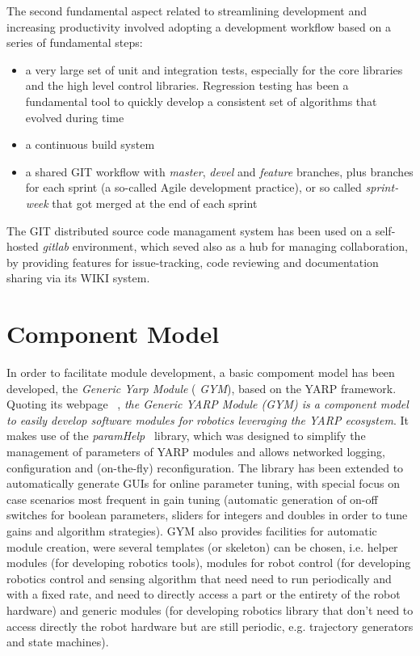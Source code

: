 The second fundamental aspect related to streamlining development and increasing productivity involved  adopting a development workflow based on a series of fundamental steps:
\begin{itemize}
 \item a very large set of unit and integration tests, especially for the core libraries and the high level control libraries. Regression testing has been a fundamental tool to quickly develop a consistent set of algorithms that evolved during time
 \item a continuous build system
 \item a shared GIT workflow with \emph{master}, \emph{devel} and \emph{feature} branches, plus branches for each sprint (a so-called Agile development practice), or so called \emph{sprint-week} that got merged at the end of each sprint
\end{itemize}
The GIT distributed source code managament system has been used on a self-hosted \emph{gitlab} environment, which seved also as a hub for managing collaboration, by providing features for issue-tracking, code reviewing and documentation sharing via its WIKI system.

\section{Component Model}
In order to facilitate module development, a basic compoment model has been developed, the \emph{Generic Yarp Module} ( \emph{GYM}), based on the YARP framework.
Quoting its webpage ~\cite{GYM}, \emph{the Generic YARP Module (GYM) is a component model to easily develop software modules for robotics leveraging the YARP ecosystem}.
It makes use of the \emph{paramHelp}~\cite{paramHelp} library, which was designed to simplify the management of parameters of YARP modules and allows networked logging, configuration and (on-the-fly) reconfiguration. The library has been extended to automatically generate GUIs for online parameter tuning, with special focus on case scenarios most frequent in gain tuning (automatic generation of on-off switches for boolean parameters, sliders for integers and doubles in order to tune gains and algorithm strategies). GYM also provides facilities for automatic module creation, were several templates (or skeleton) can be chosen, i.e. helper modules (for developing robotics tools), modules for robot control (for developing robotics control and sensing algorithm that need need to run periodically and with a fixed rate, and need to directly access a part or the entirety of the robot hardware) and generic modules (for developing robotics library that don't need to access directly the robot hardware but are still periodic, e.g. trajectory generators and state machines). 

